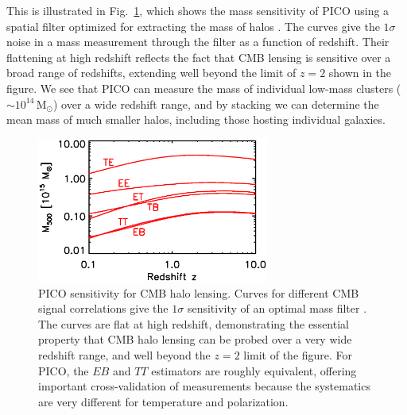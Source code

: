 \documentclass[PICOReport.tex]{subfiles}
\begin{document}
This is illustrated in Fig.~\ref{fig:HaloLensing}, which shows the mass sensitivity of PICO using a spatial filter optimized for extracting the mass of halos \citep{2015A&A...578A..21M}.  The curves give the $1\sigma$ noise in a mass measurement through the filter as a function of redshift. Their flattening at high redshift reflects the fact that CMB lensing is sensitive over a broad range of redshifts, extending well beyond the limit of $z=2$ shown in the figure.  We see that PICO can measure the mass of individual low-mass clusters ($\sim 10^{14}$\,M$_\odot$) over a wide redshift range, and by stacking we can determine the mean mass of much smaller halos, including those hosting individual galaxies.  

\begin{figure}[t]
\hspace{-0.1in}
\parbox{3.1in}{\centerline {
\includegraphics[width=3.0in]{images/m500lim_vs_z_pico_polar_v3.eps} } }
\hspace{0.in}
\parbox{3.4in}{
\caption{\captiontext 
PICO sensitivity for CMB halo lensing.  Curves for different CMB signal correlations give the $1\sigma$ sensitivity of an optimal mass filter \citep{2015A&A...578A..21M}.  The curves are flat at high redshift, demonstrating the essential property that CMB halo lensing can be probed over a very wide redshift range, and well beyond the $z=2$ limit of the figure.  For PICO, the $EB$ and $TT$ estimators are roughly equivalent, offering important cross-validation of measurements because the systematics are very different for temperature and polarization. 
\label{fig:HaloLensing} 
} }
\vspace{-0.1in}
\end{figure}
\end{document}
